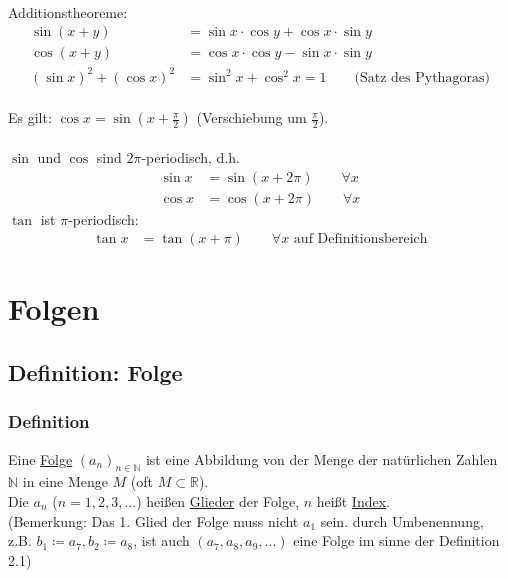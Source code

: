 \documentclass[12pt, titlepage]{article}
\newcommand{\R}{\mathds{R}}
\newcommand{\N}{\mathds{N}}
\renewcommand{\>}{\rightarrow}
\renewcommand{\*}{\cdot}
\begin{document}
\begin{itemize}
\\
	Additionstheoreme:
	\begin{align*}
		\sin (x+y)&=\sin x\*\cos y+\cos x\* \sin y\\
		\cos(x+y)&=\cos x\*\cos y-\sin x\*\sin y\\
		(\sin x)^2+(\cos x)^2&=\sin^2x+\cos^2x=1\qquad\textrm{(Satz des Pythagoras)}
	\end{align*}
	\\
	Es gilt: $\cos x=\sin (x+\frac{\pi}{2})$ (Verschiebung um $\frac{\pi}{2}$).\\
	\\
	$\sin$ und $\cos$ sind $2\pi$-periodisch, d.h.
	\begin{align*}
		\sin x&=\sin(x+2\pi)\qquad\forall x\\
		\cos x&=\cos (x+2\pi)\qquad\forall x
	\end{align*}
	$\tan$ ist $\pi$-periodisch:
	\begin{align*}
		\tan x&=\tan(x+\pi)\qquad\forall x\textrm{ auf Definitionsbereich}
	\end{align*}
	\end{itemize}
	\newpage
	\section{Folgen}
	\subsection{Definition: Folge}
	\subsubsection*{Definition}
	Eine \underline{Folge} $(a_n)_{n\in\N}$ ist eine Abbildung von der Menge der natürlichen Zahlen $\N$ in eine Menge $M$ (oft $M\subset \R$).\\
	Die $a_n$ ($n=1,2,3,...$) heißen \underline{Glieder} der Folge, $n$ heißt \underline{Index}.\\
	(Bemerkung: Das 1. Glied der Folge muss nicht $a_1$ sein. durch Umbenennung, z.B. $b_1\coloneqq a_7, b_2\coloneqq a_8$, ist auch $(a_7, a_8, a_9, ...)$ eine Folge im sinne der Definition 2.1)
\end{document}
